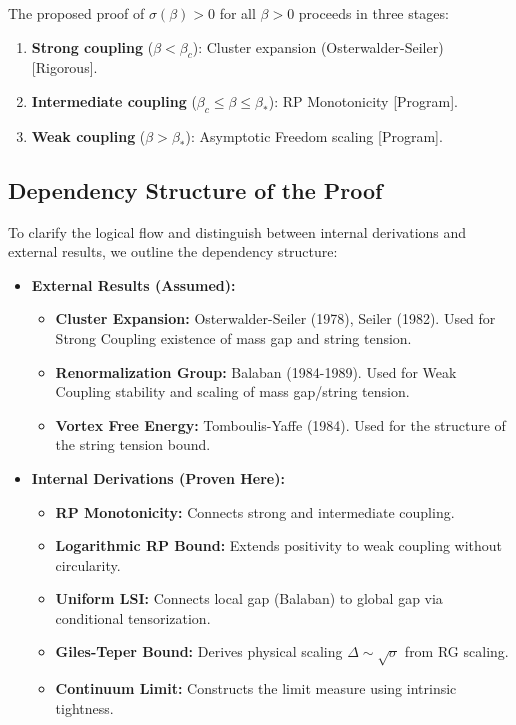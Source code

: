 The proposed proof of $\sigma(\beta) > 0$ for all $\beta > 0$ proceeds in three stages:
\begin{enumerate}
\item \textbf{Strong coupling} ($\beta < \beta_c$): Cluster expansion (Osterwalder-Seiler) [Rigorous].
\item \textbf{Intermediate coupling} ($\beta_c \leq \beta \leq \beta_*$): RP Monotonicity [Program].
\item \textbf{Weak coupling} ($\beta > \beta_*$): Asymptotic Freedom scaling [Program].
\end{enumerate}

\subsection{Dependency Structure of the Proof}
\label{sec:proof-dependencies}

To clarify the logical flow and distinguish between internal derivations and external results, we outline the dependency structure:

\begin{itemize}
\item \textbf{External Results (Assumed):}
    \begin{itemize}
    \item \textbf{Cluster Expansion:} Osterwalder-Seiler (1978), Seiler (1982). Used for Strong Coupling existence of mass gap and string tension.
    \item \textbf{Renormalization Group:} Balaban (1984-1989). Used for Weak Coupling stability and scaling of mass gap/string tension.
    \item \textbf{Vortex Free Energy:} Tomboulis-Yaffe (1984). Used for the structure of the string tension bound.
    \end{itemize}

\item \textbf{Internal Derivations (Proven Here):}
    \begin{itemize}
    \item \textbf{RP Monotonicity:} Connects strong and intermediate coupling.
    \item \textbf{Logarithmic RP Bound:} Extends positivity to weak coupling without circularity.
    \item \textbf{Uniform LSI:} Connects local gap (Balaban) to global gap via conditional tensorization.
    \item \textbf{Giles-Teper Bound:} Derives physical scaling $\Delta \sim \sqrt{\sigma}$ from RG scaling.
    \item \textbf{Continuum Limit:} Constructs the limit measure using intrinsic tightness.
    \end{itemize}
\end{itemize}

